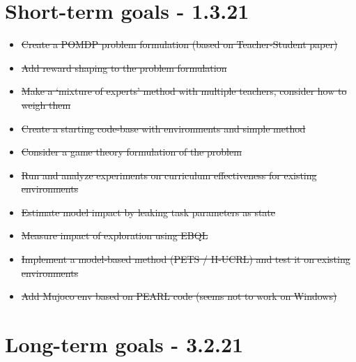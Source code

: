 \documentclass[letterpaper]{article}
\theoremstyle{definition}
\begin{document}
\section{Short-term goals - 1.3.21} \label{sec:short-term}

\begin{itemize}
	\item \sout{Create a POMDP problem formulation (based on Teacher-Student paper) }
	\item \sout{Add reward shaping to the problem formulation}
	\item \sout{Make a `mixture of experts' method with multiple teachers, consider how to weigh them}
	\item \sout{Create a starting code-base with environments and simple method}
	\item \sout{Consider a game theory formulation of the problem}
	\item \sout{Run and analyze experiments on curriculum effectiveness for existing environments}
	\item \sout{Estimate model impact by leaking task parameters as state}
	\item \sout{Measure impact of exploration using EBQL}
	\item \sout{Implement a model-based method (PETS / H-UCRL) and test it on existing environments}
	\item \sout{Add Mujoco env based on PEARL code (seems not to work on Windows)}
\end{itemize}


\section{Long-term goals - 3.2.21} \label{sec:long-term}
\end{document}
